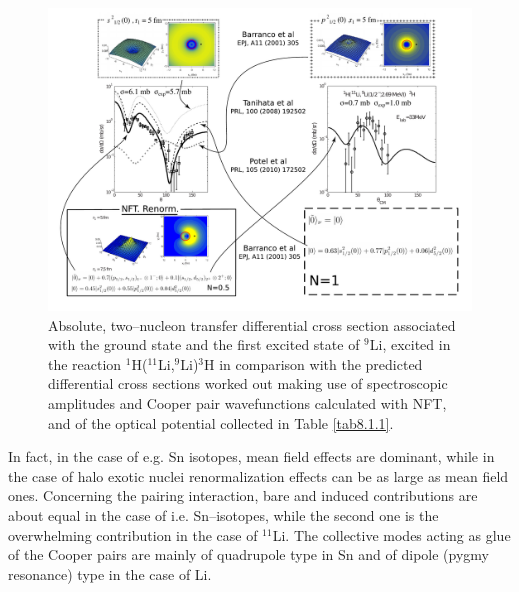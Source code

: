   \begin{figure}
  \centerline{\includegraphics*[width=18cm,angle=0]{C8/figsC8/fig8_1_3}}
  	\caption{Absolute, two--nucleon transfer differential cross section associated with the ground state and the first 	excited state of $^9$Li, excited  in the reaction $^1$H($^{11}$Li,$^9$Li)$^3$H \citep{Tanihata:08} in comparison with the predicted differential cross sections \citep{Potel:10} worked out making use of spectroscopic amplitudes and Cooper pair wavefunctions calculated with NFT, and of the optical potential collected in Table \ref{tab8.1.1}.}\label{fig8_1_2}
  \end{figure}
 In fact, in the case of e.g. Sn isotopes, mean field effects are dominant, while in the case of halo exotic nuclei renormalization effects can be as large as mean field ones. Concerning the pairing interaction, bare and induced contributions are about equal in the case of i.e. Sn--isotopes, while the second one is the overwhelming contribution in the case of $^{11}$Li. The collective modes acting as glue of the Cooper pairs are mainly of quadrupole type in Sn and of dipole (pygmy resonance) type in the case of Li. 

 
 
 
 
 
 

